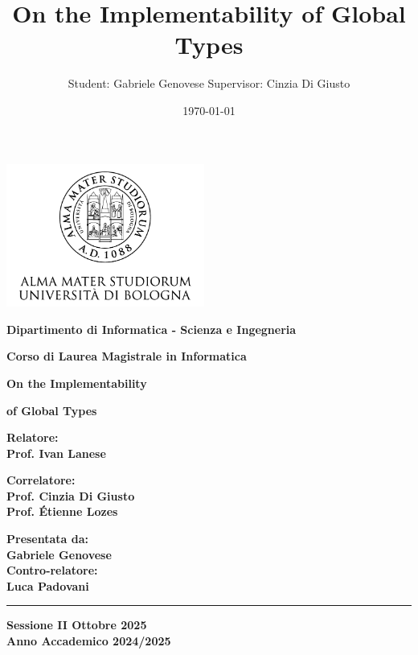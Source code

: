 \documentclass[12pt,a4paper,twoside]{book}
\title{On the Implementability of Global Types}
\author{Student: Gabriele Genovese Supervisor: Cinzia Di Giusto}
\date{\today}
\theoremstyle{definition}
\theoremstyle{definition}
\theoremstyle{definition}
\begin{document}
\begin{titlepage}
\begin{center}
    \includegraphics[width=6.5cm,height=4.7cm]{img/unibo.png}
    
    \vspace{10mm}
   
    {\large{\bf{Dipartimento di Informatica - Scienza e Ingegneria}}} 
    
    \vspace{5mm}
    
    {\Large{\bf{Corso di Laurea Magistrale in Informatica}}}
    
    \vspace{15mm}
    
    {\Huge{\bf On the Implementability }}\\
    
    \vspace{3mm}
    
    {\Huge{\bf of Global Types}}\\
   
    \vspace{3mm}
\end{center}

\vspace{10mm}

\begin{minipage}[t]{0.45\textwidth}
    
    {\Large{\bf Relatore: \\ Prof. Ivan Lanese}}
    
    \vspace{3mm}
    
    {\Large{\bf Correlatore:\\Prof. Cinzia Di Giusto\\Prof. Étienne Lozes}}
\end{minipage}
\hfill
\begin{minipage}[t]{0.37\textwidth}\raggedleft
    {\Large{\bf Presentata da: \\ Gabriele Genovese}}\\
    {\Large{\bf Contro-relatore: \\ Luca Padovani}}
\end{minipage}

\vspace{25mm}
\rule[0.5cm]{15.8cm}{0.6mm}

\begin{center}
    {\large{\bf Sessione II Ottobre 2025 \\}}
    {\large{\bf Anno Accademico 2024/2025\\}}
\end{center}

\end{titlepage}
\end{document}
